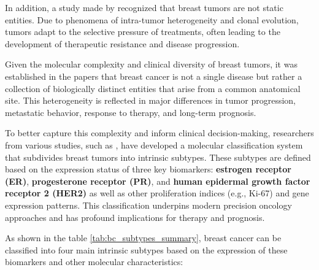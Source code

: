 In addition, a study made by \textcite{origins_and_evolution_bca_Polyak2007}
recognized that breast tumors are not static entities. Due to phenomena of
intra-tumor heterogeneity and clonal evolution, tumors adapt to the selective
pressure of treatments, often leading to the development of therapeutic
resistance and disease progression.

Given the molecular complexity and clinical diversity of breast tumors, it was
established in the papers
\textcite{clinical_implication_bca_Adamo2015,bc_subtypes_Prat2015Clinical} that
breast cancer is not a single disease but rather a collection of biologically
distinct entities that arise from a common anatomical site. This heterogeneity
is reflected in major differences in tumor progression, metastatic behavior,
response to therapy, and long-term prognosis.

To better capture this complexity and inform clinical decision-making,
researchers from various studies, such as
\textcite{bc_molecular_Perou2000,bc_subtypes_Prat2015Clinical}, have developed
a molecular classification system that subdivides breast tumors into intrinsic
subtypes. These subtypes are defined based on the expression status of three
key biomarkers: \textbf{estrogen receptor (ER)}, \textbf{progesterone receptor
  (PR)}, and \textbf{human epidermal growth factor receptor 2 (HER2)} as well as
other proliferation indices (e.g., Ki-67) and gene expression patterns. This
classification underpins modern precision oncology approaches and has profound
implications for therapy and prognosis.

As shown in the table \ref{tab:bc_subtypes_summary}, breast cancer can be
classified into four main intrinsic subtypes based on the expression of these
biomarkers and other molecular characteristics:

